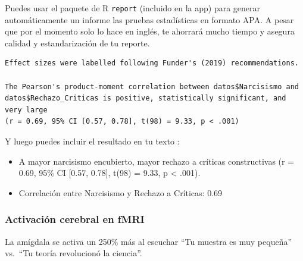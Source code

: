 \documentclass[
  10pt]{article}
\providecommand{\tightlist}{%
  \setlength{\itemsep}{0pt}\setlength{\parskip}{0pt}}\usepackage{longtable,booktabs,array}
\begin{document}
\begin{tcolorbox}[enhanced jigsaw, colframe=quarto-callout-tip-color-frame, bottomtitle=1mm, toptitle=1mm, left=2mm, arc=.35mm, toprule=.15mm, colback=white, coltitle=black, leftrule=.75mm, breakable, opacityback=0, titlerule=0mm, title=\textcolor{quarto-callout-tip-color}{\faLightbulb}\hspace{0.5em}{Tip}, rightrule=.15mm, opacitybacktitle=0.6, bottomrule=.15mm, colbacktitle=quarto-callout-tip-color!10!white]

Puedes usar el paquete de R \texttt{report} (incluido en la app) para
generar automáticamente un informe las pruebas estadísticas en formato
APA. A pesar que por el momento solo lo hace en inglés, te ahorrará
mucho tiempo y asegura calidad y estandarización de tu reporte.

\begin{verbatim}
Effect sizes were labelled following Funder's (2019) recommendations.

The Pearson's product-moment correlation between datos$Narcisismo and
datos$Rechazo_Criticas is positive, statistically significant, and very large
(r = 0.69, 95% CI [0.57, 0.78], t(98) = 9.33, p < .001)
\end{verbatim}

Y luego puedes incluir el resultado en tu texto
:

\begin{itemize}
\tightlist
\item
  A mayor narcisismo encubierto, mayor rechazo a críticas constructivas
  (r = 0.69, 95\% CI {[}0.57, 0.78{]}, t(98) = 9.33, p \textless{}
  .001).
\item
  Correlación entre Narcisismo y Rechazo a Críticas: 0.69
\end{itemize}

\end{tcolorbox}

\subsubsection{Activación cerebral en
fMRI}\label{activaciuxf3n-cerebral-en-fmri}

La amígdala se activa un 250\% más al escuchar ``Tu muestra es muy
pequeña'' vs.~``Tu teoría revolucionó la ciencia''.
\end{document}
